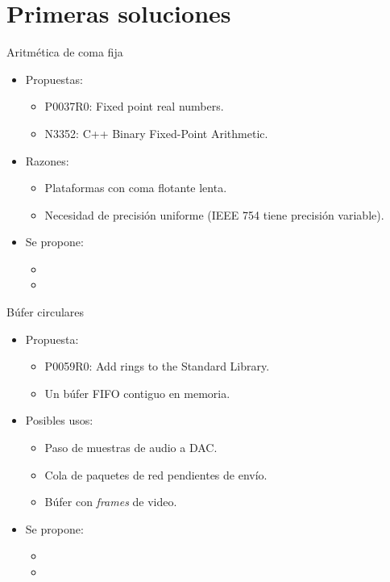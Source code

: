 \section{Primeras soluciones}

\begin{frame}[t]{Aritmética de coma fija}
\begin{itemize}
  \item Propuestas:
    \begin{itemize}
      \item P0037R0: Fixed point real numbers.
      \item N3352: C++ Binary Fixed-Point Arithmetic.
    \end{itemize}
  \vfill
  \item Razones:
    \begin{itemize}
      \item Plataformas con coma flotante lenta.
      \item Necesidad de precisión uniforme (IEEE 754 tiene precisión variable).
    \end{itemize}
  \vfill
  \item Se propone:
    \begin{itemize}
      \item {}
      \item {}
    \end{itemize}
\end{itemize}
\end{frame}

\begin{frame}[t]{Búfer circulares}
\begin{itemize}
  \item Propuesta:
    \begin{itemize}
      \item P0059R0: Add rings to the Standard Library.
      \item Un búfer FIFO contiguo en memoria.
    \end{itemize}
  \vfill
  \item Posibles usos:
    \begin{itemize}
      \item Paso de muestras de audio a DAC.
      \item Cola de paquetes de red pendientes de envío.
      \item Búfer con \emph{frames} de video.
    \end{itemize}
  \vfill
  \item Se propone:
    \begin{itemize}
      \item {}
      \item {}
    \end{itemize}
\end{itemize}
\end{frame}

